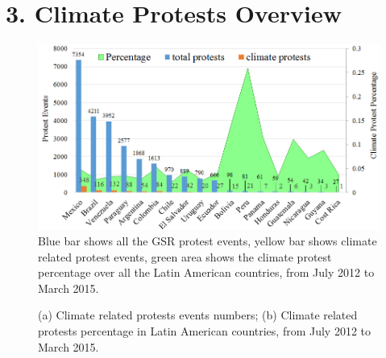 \documentclass[9pt,twocolumn,twoside]{pnas-new}
\begin{document}
%



\section*{3. Climate Protests Overview}

\begin{figure}[ht]
\centerline
{\includegraphics[width=.45\textwidth]{figures/month-country-protest3}}
\caption{Blue bar shows all the GSR protest events, yellow bar shows climate related protest events, green area shows the climate protest percentage over all the Latin American countries, from July 2012 to March 2015.}
\label{month_percentage}
\end{figure}


\begin{figure}[ht]
	\centering
	\caption{(a) Climate related protests events numbers; (b) Climate related protests percentage in Latin American countries, from July 2012 to March 2015. }
\label{map}
\end{figure}
\end{document}
